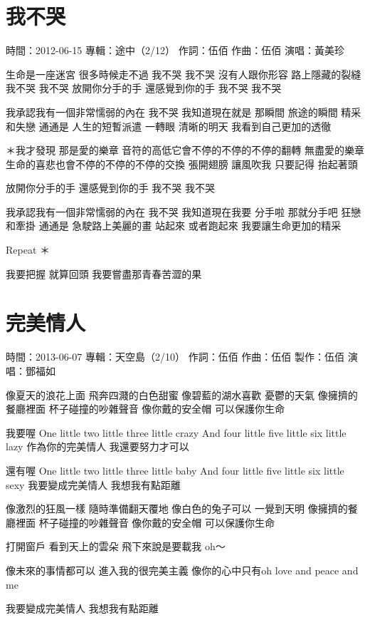 \documentclass[UTF8,a4paper,oneside,twocolumn,12pt]{ctexbook}
\newcommand{\infopair}[2]{\textbullet #1：#2}
\newcommand{\zc}[1][伍佰]{\infopair{作詞}{#1}}
\newcommand{\zq}[1][伍佰]{\infopair{作曲}{#1}}
\newcommand{\zj}[1]{\infopair{專輯}{#1}}
\newcommand{\zz}[1]{\infopair{製作}{#1}}
\newcommand{\sj}[1]{\infopair{時間}{#1}}
\newenvironment{info}{\begin{flushleft}\kaishu
	}
	{\end{flushleft}\normalsize\yahei\par}
\newenvironment{lyric}{
	}
{}
\begin{document}
\section{我不哭}
\begin{info}
	\sj{2012-06-15}
	\zj{途中（2/12）}
	\zc
	\zq
	\infopair{演唱}{黃美珍}
\end{info}
\begin{lyric}
	生命是一座迷宮 很多時候走不過
	我不哭 我不哭
	沒有人跟你形容 路上隱藏的裂縫
	我不哭 我不哭
	放開你分手的手 還感覺到你的手
	我不哭 我不哭

	我承認我有一個非常懦弱的內在
	我不哭 我知道現在就是
	那瞬間 旅途的瞬間
	精采和失戀 通通是
	人生的短暫派遣
	一轉眼 清晰的明天
	我看到自己更加的透徹

	＊我才發現 那是愛的樂章
	音符的高低它會不停的不停的不停的翻轉
	無盡愛的樂章
	生命的喜悲也會不停的不停的不停的交換
	張開翅膀 讓風吹我
	只要記得 抬起著頭

	放開你分手的手
	還感覺到你的手
	我不哭 我不哭

	我承認我有一個非常懦弱的內在
	我不哭 我知道現在我要
	分手啦 那就分手吧
	狂戀和牽掛 通通是
	急駛路上美麗的畫
	站起來 或者跑起來
	我要讓生命更加的精采

	Repeat ＊

	我要把握 就算回頭
	我要嘗盡那青春苦澀的果
\end{lyric}

\section{完美情人}
\begin{info}
	\sj{2013-06-07}
	\zj{天空島（2/10）}
	\zc
	\zq
	\zz{伍佰}
	\infopair{演唱}{鄧福如}
\end{info}
\begin{lyric}
	像夏天的浪花上面 飛奔四濺的白色甜蜜
	像碧藍的湖水喜歡 憂鬱的天氣
	像擁擠的餐廳裡面 杯子碰撞的吵雜聲音
	像你戴的安全帽 可以保護你生命

	我要喔 One little two little three
	little crazy And four little five
	little six little lazy
	作為你的完美情人 我還要努力才可以

	還有喔 One little two little three
	little baby And four little five
	little six little sexy
	我要變成完美情人 我想我有點距離

	像激烈的狂風一樣 隨時準備翻天覆地
	像白色的兔子可以 一覺到天明
	像擁擠的餐廳裡面 杯子碰撞的吵雜聲音
	像你戴的安全帽 可以保護你生命

	打開窗戶 看到天上的雲朵
	飛下來說是要載我 oh～

	像未來的事情都可以 進入我的很完美主義
	像你的心中只有oh love and peace and me

	我要變成完美情人 我想我有點距離
\end{lyric}
\end{document}
